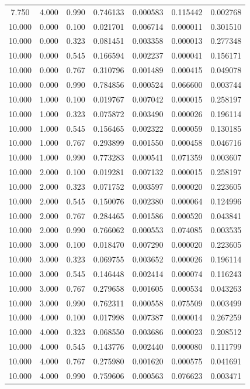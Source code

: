 \documentclass{article}
\begin{document}
\begin{longtable}{ccccccc}
    7.750& 4.000& 0.990&0.746133&0.000583&0.115442&0.002768\\
   10.000& 0.000& 0.100&0.021701&0.006714&0.000011&0.301510\\
   10.000& 0.000& 0.323&0.081451&0.003358&0.000013&0.277348\\
   10.000& 0.000& 0.545&0.166594&0.002237&0.000041&0.156171\\
   10.000& 0.000& 0.767&0.310796&0.001489&0.000415&0.049078\\
   10.000& 0.000& 0.990&0.784856&0.000524&0.066600&0.003744\\
   10.000& 1.000& 0.100&0.019767&0.007042&0.000015&0.258197\\
   10.000& 1.000& 0.323&0.075872&0.003490&0.000026&0.196114\\
   10.000& 1.000& 0.545&0.156465&0.002322&0.000059&0.130185\\
   10.000& 1.000& 0.767&0.293899&0.001550&0.000458&0.046716\\
   10.000& 1.000& 0.990&0.773283&0.000541&0.071359&0.003607\\
   10.000& 2.000& 0.100&0.019281&0.007132&0.000015&0.258197\\
   10.000& 2.000& 0.323&0.071752&0.003597&0.000020&0.223605\\
   10.000& 2.000& 0.545&0.150076&0.002380&0.000064&0.124996\\
   10.000& 2.000& 0.767&0.284465&0.001586&0.000520&0.043841\\
   10.000& 2.000& 0.990&0.766062&0.000553&0.074085&0.003535\\
   10.000& 3.000& 0.100&0.018470&0.007290&0.000020&0.223605\\
   10.000& 3.000& 0.323&0.069755&0.003652&0.000026&0.196114\\
   10.000& 3.000& 0.545&0.146448&0.002414&0.000074&0.116243\\
   10.000& 3.000& 0.767&0.279658&0.001605&0.000534&0.043263\\
   10.000& 3.000& 0.990&0.762311&0.000558&0.075509&0.003499\\
   10.000& 4.000& 0.100&0.017998&0.007387&0.000014&0.267259\\
   10.000& 4.000& 0.323&0.068550&0.003686&0.000023&0.208512\\
   10.000& 4.000& 0.545&0.143776&0.002440&0.000080&0.111799\\
   10.000& 4.000& 0.767&0.275980&0.001620&0.000575&0.041691\\
   10.000& 4.000& 0.990&0.759606&0.000563&0.076623&0.003471\\
   \bottomrule
  \end{longtable}
\end{document}
